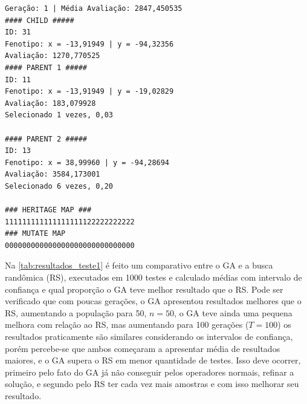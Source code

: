 %
%

\begin{minipage}{\linewidth}
	\noindent
\begin{lstlisting}[caption = {Resultado de um ciclo de seleção, crossover e mutação do teste preliminar}, label=lst:resultado_reproducao_t1]
Geração: 1 | Média Avaliação: 2847,450535
#### CHILD #####
ID: 31
Fenotipo: x = -13,91949 | y = -94,32356
Avaliação: 1270,770525
#### PARENT 1 #####
ID: 11
Fenotipo: x = -13,91949 | y = -19,02829
Avaliação: 183,079928
Selecionado 1 vezes, 0,03

#### PARENT 2 #####
ID: 13
Fenotipo: x = 38,99960 | y = -94,28694
Avaliação: 3584,173001
Selecionado 6 vezes, 0,20

### HERITAGE MAP ###
111111111111111111122222222222
### MUTATE MAP
000000000000000000000000000000
\end{lstlisting}
\end{minipage}

Na \autoref{tab:resultados_teste1} é feito um comparativo entre o GA e a busca randômica (RS), executados em 1000 testes e calculado médias com intervalo de confiança e qual proporção o GA teve melhor resultado que o RS. Pode ser verificado que com poucas gerações, o GA apresentou resultados melhores que o RS, aumentando a população para 50, \(n=50\), o GA teve ainda uma pequena melhora com relação ao RS, mas aumentando para 100 gerações (\(T=100\)) os resultados praticamente são similares considerando os intervalos de confiança, porém percebe-se que ambos começaram a apresentar média de resultados maiores, e o GA supera o RS em menor quantidade de testes. Isso deve ocorrer, primeiro pelo fato do GA já não conseguir pelos operadores normais, refinar a solução, e segundo pelo RS ter cada vez mais amostras e com isso melhorar seu resultado.

